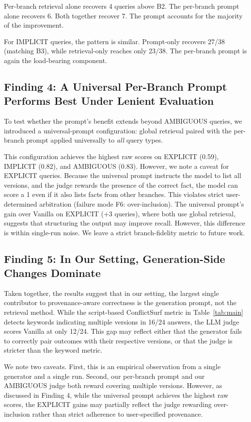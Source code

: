 \documentclass[conference]{IEEEtran}
\begin{document}
Per-branch retrieval alone recovers 4 queries above B2. The per-branch prompt alone recovers 6. Both together recover 7. The prompt accounts for the majority of the improvement.

For IMPLICIT queries, the pattern is similar. Prompt-only recovers 27/38 (matching B3), while retrieval-only reaches only 23/38. The per-branch prompt is again the load-bearing component.

\subsection{Finding 4: A Universal Per-Branch Prompt Performs Best Under Lenient Evaluation}

To test whether the prompt's benefit extends beyond AMBIGUOUS queries, we introduced a universal-prompt configuration: global retrieval paired with the per-branch prompt applied universally to \emph{all} query types. 

This configuration achieves the highest raw scores on EXPLICIT (0.59), IMPLICIT (0.82), and AMBIGUOUS (0.83). However, we note a caveat for EXPLICIT queries. Because the universal prompt instructs the model to list all versions, and the judge rewards the presence of the correct fact, the model can score a 1 even if it also lists facts from other branches. This violates strict user-determined arbitration (failure mode F6: over-inclusion). The universal prompt's gain over Vanilla on EXPLICIT (+3 queries), where both use global retrieval, suggests that structuring the output may improve recall. However, this difference is within single-run noise. We leave a strict branch-fidelity metric to future work.

\subsection{Finding 5: In Our Setting, Generation-Side Changes Dominate}

Taken together, the results suggest that in our setting, the largest single contributor to provenance-aware correctness is the generation prompt, not the retrieval method. While the script-based ConflictSurf metric in Table~\ref{tab:main} detects keywords indicating multiple versions in 16/24 answers, the LLM judge scores Vanilla at only 12/24. This gap may reflect either that the generator fails to correctly pair outcomes with their respective versions, or that the judge is stricter than the keyword metric.

We note two caveats. First, this is an empirical observation from a single generator and a single run. Second, our per-branch prompt and our AMBIGUOUS judge both reward covering multiple versions. However, as discussed in Finding 4, while the universal prompt achieves the highest raw scores, the EXPLICIT gains may partially reflect the judge rewarding over-inclusion rather than strict adherence to user-specified provenance.
\end{document}
